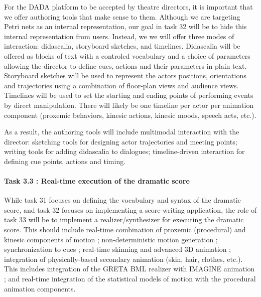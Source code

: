 For the DADA platform to be accepted by theatre directors, it is important that we offer authoring tools that make sense to them. 
Although we are targeting  Petri nets as an internal representation, our goal in task 32 will be to hide this internal representation 
from users. Instead, we we will offer three modes of interaction: didascalia, storyboard sketches, and timelines. Didascalia will
be offered as blocks of text with a controled vocabulary and a choice of parameters allowing the director to define cues, actions and their parameters 
in plain text.  Storyboard sketches will be used to represent the actors positions, orientations and trajectories using a combination of floor-plan views 
and audience views. Timelines will be used to set the starting and ending points of performing events by direct manipulation. There will likely be
one timeline per actor per animation component (proxemic behaviors, kinesic actions, kinesic moods, speech acts, etc.).

As a result, the authoring tools will include multimodal interaction with the director: sketching tools for designing actor trajectories and meeting points; 
writing tools for adding didascalia to dialogues; timeline-driven interaction for defining cue points, actions and timing. 




\paragraph{Task 3.3 : Real-time execution of the dramatic score} 

While task 31 focuses on defining the vocabulary and syntax of the dramatic score, and task 32 focuses on implementing 
a score-writing application, the role of task 33 will be to implement a realizer/synthesizer for executing the dramatic score.
This should include real-time combination of proxemic (procedural) and kinesic components of motion ; non-deterministic motion generation ; synchronization to cues ; real-time skinning and advanced 3D animation ; integration of physically-based secondary animation (skin, hair, clothes, etc.).  This includes integration of the GRETA BML realizer with IMAGINE animation ; and real-time integration of the statistical models of motion with the procedural animation components.


